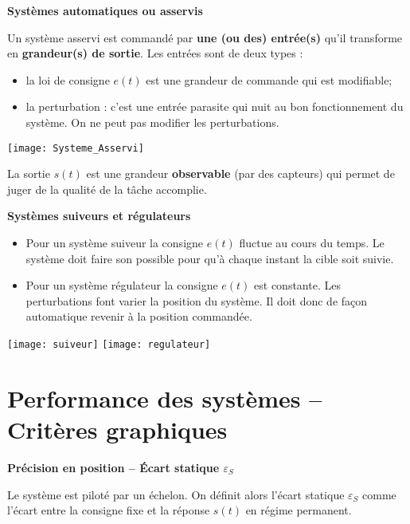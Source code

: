 \begin{defi}\textbf{Systèmes automatiques ou asservis} ~\\

\noindent\begin{minipage}[c]{11cm}
Un système asservi est commandé par \textbf{une (ou des) entrée(s)} qu'il
transforme en \textbf{grandeur(s) de sortie}.
Les entrées sont de deux types : 
\begin{itemize}
 \item la loi de consigne $e(t)$ est une grandeur de commande qui est
modifiable;
\item la perturbation : c'est une entrée parasite qui nuit au bon
fonctionnement du système. On ne peut pas modifier les perturbations.
\end{itemize}
\end{minipage} \hfill
\begin{minipage}[c]{5cm}
\texttt{[image: Systeme\_Asservi]}
\end{minipage}

\noindent
La sortie $s(t)$ est une grandeur \textbf{observable} (par des capteurs) qui
permet de juger de la qualité de la tâche accomplie.


\end{defi} 


\begin{defi}\textbf{Systèmes suiveurs et régulateurs} ~\\
\begin{itemize}[label=,font=\color{bleuxp}] 
\item Pour un système suiveur la consigne $e(t)$ fluctue au cours du temps. Le système doit faire son possible pour qu'à chaque instant la cible soit suivie.
\item Pour un système régulateur la consigne $e(t)$ est constante. Les perturbations font varier la position du système. Il doit donc de façon automatique revenir à la position commandée.
\end{itemize}
\end{defi}


\begin{center}
%
\texttt{[image: suiveur]}
\hspace{2cm}
%
\texttt{[image: regulateur]}
\end{center}



\section{Performance des systèmes -- Critères graphiques}
\begin{defi}\textbf{Précision en position -- Écart statique $\varepsilon_S$}

Le système est piloté par un échelon. On définit alors l'écart statique $\varepsilon_S$ comme l'écart entre la consigne fixe et la réponse $s(t)$ en régime permanent.
\end{defi}

